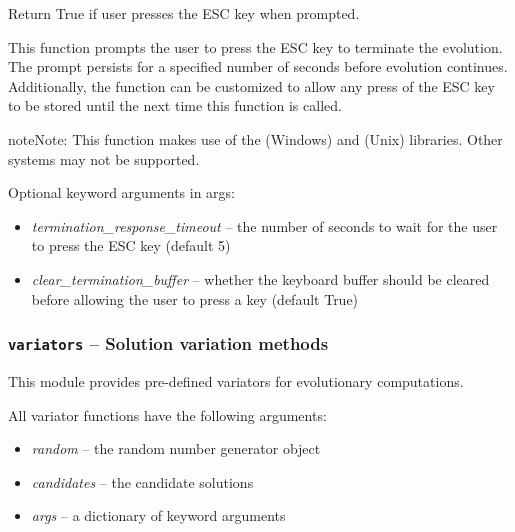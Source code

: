 \documentclass[letterpaper,10pt,english]{sphinxmanual}
\begin{document}

\begin{fulllineitems}
\label{reference:inspyred.ec.terminators.user_termination}
Return True if user presses the ESC key when prompted.

This function prompts the user to press the ESC key to terminate the 
evolution. The prompt persists for a specified number of seconds before
evolution continues. Additionally, the function can be customized to 
allow any press of the ESC key to be stored until the next time this 
function is called.

\begin{notice}{note}{Note:}
This function makes use of the  (Windows) and  
(Unix) libraries. Other systems may not be supported.
\end{notice}

Optional keyword arguments in args:
\begin{itemize}
\item {} 
\emph{termination\_response\_timeout} -- the number of seconds to wait for 
the user to press the ESC key (default 5)

\item {} 
\emph{clear\_termination\_buffer} -- whether the keyboard buffer should be 
cleared before allowing the user to press a key (default True)

\end{itemize}

\end{fulllineitems}

\label{reference:module-inspyred.ec.variators}

\subsubsection{\texttt{variators} -- Solution variation methods}
\label{reference:variators-solution-variation-methods}
This module provides pre-defined variators for evolutionary computations.

All variator functions have the following arguments:
\begin{itemize}
\item {} 
\emph{random} -- the random number generator object

\item {} 
\emph{candidates} -- the candidate solutions

\item {} 
\emph{args} -- a dictionary of keyword arguments

\end{itemize}
\end{document}
